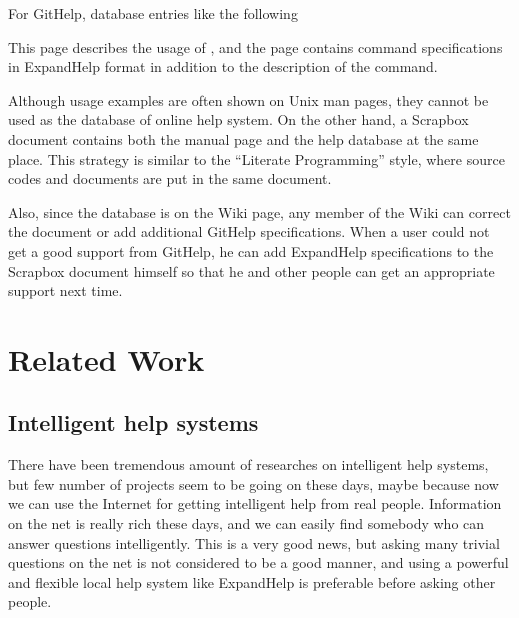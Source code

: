 \documentclass{sigchi}
\def\GH{\textsf{GitHelp}}
\def\SB{\textsf{Scrapbox}}
\def\EH{\textsf{ExpandHelp}}
\begin{document}
For {\GH}, database entries like the following


This page describes the usage of , and
the page contains command specifications in {\EH} format
in addition to the description of the command.
%

Although usage examples are often shown on Unix man pages,
they cannot be used as the database of online help system.
On the other hand,
a {\SB} document contains both the manual page and the help database
at the same place.
%
This strategy is similar to the
``Literate Programming'' style,
where source codes and documents are put in the same document.

Also, since the database is on the Wiki page, any member of the
Wiki can correct the document or add additional {\GH} specifications.
When a user could not get a good support from {\GH}, he can add
{\EH} specifications to the {\SB} document himself
so that he and other people can get an appropriate support next time.

\section{Related Work}

\subsection{Intelligent help systems}

There have been tremendous amount of researches on intelligent help systems\cite{Delisle:2002:UIH:606412.606415},
but few number of projects seem to be going on these days,
maybe because now we can use the Internet for getting intelligent help from
real people.
Information on the net is really rich these days, and we can easily
find somebody who can answer questions intelligently.
This is a very good news, but 
asking many trivial questions on the net is not considered to be a
good manner, and
using a powerful and flexible local help system like ExpandHelp is
preferable before asking other people.
\end{document}
